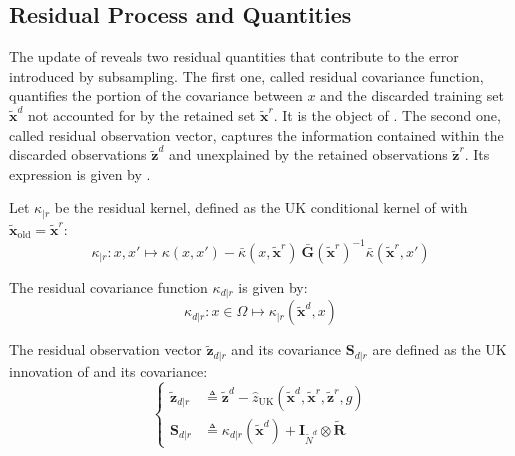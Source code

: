\subsection{Residual Process and Quantities}

The update of  reveals two residual quantities that contribute to the error introduced by subsampling. The first one, called residual covariance function, quantifies the portion of the covariance between $x$ and the discarded training set $\tilde{\mathbf{x}}^d$ not accounted for by the retained set $\tilde{\mathbf{x}}^r$. It is the object of . The second one, called residual observation vector, captures the information contained within the discarded observations $\tilde{\mathbf{z}}^d$ and unexplained by the retained observations $\tilde{\mathbf{z}}^r$. Its expression is given by .

\begin{definition}\label{th:residual_covariance_function}
	Let $\kappa_{|r}$ be the residual kernel, defined as the UK conditional kernel of  with $\tilde{\mathbf{x}}_{\mathrm{old}}=\tilde{\mathbf{x}}^r$:
	\begin{equation}
		\kappa_{|r}:x,x'\mapsto \kappa(x,x')-\bar{\kappa}(x,\tilde{\mathbf{x}}^r)\:\bar{\mathbf{G}}(\tilde{\mathbf{x}}^r)^{-1}\bar{\kappa}(\tilde{\mathbf{x}}^r,x')
	\end{equation}

	The residual covariance function $\kappa_{d|r}$ is given by:
	\begin{equation}
		\kappa_{d|r}:x\in\Omega\mapsto \kappa_{|r}(\tilde{\mathbf{x}}^d,x)
	\end{equation}
\end{definition}

\begin{definition}\label{th:residual_observation_vector}
	The residual observation vector $\tilde{\mathbf{z}}_{d|r}$ and its covariance $\mathbf{S}_{d|r}$ are defined as the UK innovation of  and its covariance:
	\begin{equation}
		\left\{\begin{aligned}
		\tilde{\mathbf{z}}_{d|r}&\triangleq\tilde{\mathbf{z}}^d-\hat{z}_{\mathrm{UK}}(\tilde{\mathbf{x}}^d,\tilde{\mathbf{x}}^r,\tilde{\mathbf{z}}^r,g)\\
		\mathbf{S}_{d|r}&\triangleq \kappa_{d|r}(\tilde{\mathbf{x}}^d)+\mathbf{I}_{\tilde{N}^d}\otimes\tilde{\mathbf{R}}
		\end{aligned}\right.
	\end{equation}
\end{definition}

